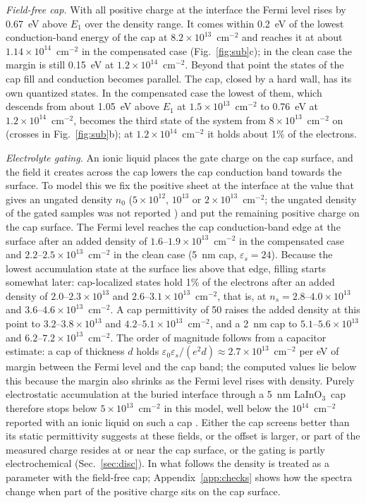 \documentclass[11pt]{article}
\newcommand{\LIO}{\texorpdfstring{LaInO$_3$}{LaInO3}}
\begin{document}
\emph{Field-free cap.} With all positive charge at the interface the Fermi level rises by 0.67~eV above $E_1$ over the density range. It comes within 0.2~eV of the lowest conduction-band energy of the cap at $8.2\times10^{13}$~cm$^{-2}$ and reaches it at about $1.14\times10^{14}$~cm$^{-2}$ in the compensated case (Fig.~\ref{fig:sub}c); in the clean case the margin is still 0.15~eV at $1.2\times10^{14}$~cm$^{-2}$. Beyond that point the states of the cap fill and conduction becomes parallel. The cap, closed by a hard wall, has its own quantized states. In the compensated case the lowest of them, which descends from about 1.05~eV above $E_1$ at $1.5\times10^{13}$~cm$^{-2}$ to 0.76~eV at $1.2\times10^{14}$~cm$^{-2}$, becomes the third state of the system from $8\times10^{13}$~cm$^{-2}$ on (crosses in Fig.~\ref{fig:sub}b); at $1.2\times10^{14}$~cm$^{-2}$ it holds about 1\% of the electrons.

\emph{Electrolyte gating.} An ionic liquid places the gate charge on the cap surface, and the field it creates across the cap lowers the cap conduction band towards the surface. To model this we fix the positive sheet at the interface at the value that gives an ungated density $n_0$ ($5\times10^{12}$, $10^{13}$ or $2\times10^{13}$~cm$^{-2}$; the ungated density of the gated samples was not reported \cite{Lee2024LIO}) and put the remaining positive charge on the cap surface. The Fermi level reaches the cap conduction-band edge at the surface after an added density of $1.6$--$1.9\times10^{13}$~cm$^{-2}$ in the compensated case and $2.2$--$2.5\times10^{13}$~cm$^{-2}$ in the clean case (5~nm cap, $\varepsilon_s=24$). Because the lowest accumulation state at the surface lies above that edge, filling starts somewhat later: cap-localized states hold 1\% of the electrons after an added density of $2.0$--$2.3\times10^{13}$ and $2.6$--$3.1\times10^{13}$~cm$^{-2}$, that is, at $n_s=2.8$--$4.0\times10^{13}$ and $3.6$--$4.6\times10^{13}$~cm$^{-2}$. A cap permittivity of 50 raises the added density at this point to $3.2$--$3.8\times10^{13}$ and $4.2$--$5.1\times10^{13}$~cm$^{-2}$, and a 2~nm cap to $5.1$--$5.6\times10^{13}$ and $6.2$--$7.2\times10^{13}$~cm$^{-2}$. The order of magnitude follows from a capacitor estimate: a cap of thickness $d$ holds $\varepsilon_0\varepsilon_s/(e^2d)\approx2.7\times10^{13}$~cm$^{-2}$ per eV of margin between the Fermi level and the cap band; the computed values lie below this because the margin also shrinks as the Fermi level rises with density. Purely electrostatic accumulation at the buried interface through a 5~nm \LIO\ cap therefore stops below $5\times10^{13}$~cm$^{-2}$ in this model, well below the $10^{14}$~cm$^{-2}$ reported with an ionic liquid on such a cap \cite{Lee2024LIO}. Either the cap screens better than its static permittivity suggests at these fields, or the offset is larger, or part of the measured charge resides at or near the cap surface, or the gating is partly electrochemical (Sec.~\ref{sec:disc}). In what follows the density is treated as a parameter with the field-free cap; Appendix~\ref{app:checks} shows how the spectra change when part of the positive charge sits on the cap surface.
\end{document}
